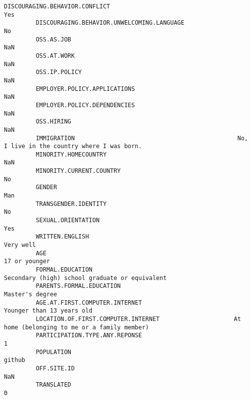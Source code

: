 \documentclass[11pt]{article}
\begin{document}
\begin{Verbatim}[commandchars=\\\{\}]
         DISCOURAGING.BEHAVIOR.CONFLICT                                                                   Yes   
         DISCOURAGING.BEHAVIOR.UNWELCOMING.LANGUAGE                                                        No   
         OSS.AS.JOB                                                                                       NaN   
         OSS.AT.WORK                                                                                      NaN   
         OSS.IP.POLICY                                                                                    NaN   
         EMPLOYER.POLICY.APPLICATIONS                                                                     NaN   
         EMPLOYER.POLICY.DEPENDENCIES                                                                     NaN   
         OSS.HIRING                                                                                       NaN   
         IMMIGRATION                                              No, I live in the country where I was born.   
         MINORITY.HOMECOUNTRY                                                                             NaN   
         MINORITY.CURRENT.COUNTRY                                                                          No   
         GENDER                                                                                           Man   
         TRANSGENDER.IDENTITY                                                                              No   
         SEXUAL.ORIENTATION                                                                               Yes   
         WRITTEN.ENGLISH                                                                            Very well   
         AGE                                                                                    17 or younger   
         FORMAL.EDUCATION                                      Secondary (high) school graduate or equivalent   
         PARENTS.FORMAL.EDUCATION                                                             Master's degree   
         AGE.AT.FIRST.COMPUTER.INTERNET                                             Younger than 13 years old   
         LOCATION.OF.FIRST.COMPUTER.INTERNET                     At home (belonging to me or a family member)   
         PARTICIPATION.TYPE.ANY.REPONSE                                                                     1   
         POPULATION                                                                                    github   
         OFF.SITE.ID                                                                                      NaN   
         TRANSLATED                                                                                         0   
         

\end{Verbatim}
\end{document}
